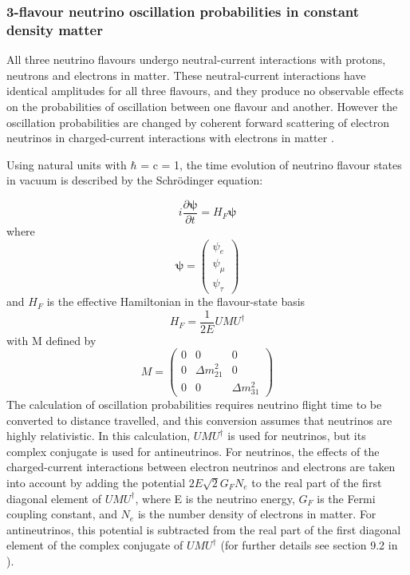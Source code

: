 %
%
\subsubsection*{3-flavour neutrino oscillation probabilities in constant density matter}

All three neutrino flavours undergo neutral-current interactions with protons, neutrons and electrons in matter. These
neutral-current interactions have identical amplitudes for all three flavours, and they produce no observable effects on
the probabilities of oscillation between one flavour and another. However the oscillation probabilities are changed by
coherent forward scattering of electron neutrinos in charged-current interactions with electrons in matter \cite{kayser2005}.

Using natural units with $\hbar$ = c = 1, the time evolution of neutrino flavour states in vacuum is described by the
Schr\"odinger equation:

\begin{equation}
i \frac{\partial \mathbf{\psi}}{\partial t} = H_{F} \mathbf{\psi}
\end{equation}
where
\begin{equation}
  \mathbf{\psi} =\left(
\begin{array}{c}
\psi_{e} \\
\psi_{\mu} \\
\psi_{\tau}
\end{array} \right)
\end{equation}
and $H_{F}$ is the effective Hamiltonian in the flavour-state basis
\begin{equation}
H_{F} = \frac{1}{2E} U M U^{\dagger}
\end{equation}
with M defined by
\begin{equation}
M = \left(
\begin{array}{ccc}
0 & 0 & 0 \\
0 & \Delta m_{21}^{2} & 0 \\
0 & 0 & \Delta m_{31}^{2}
\end{array} \right)
\end{equation}
The calculation of oscillation probabilities requires neutrino flight time to be converted to distance travelled,
and this conversion assumes that neutrinos are highly relativistic. In
this calculation, $U M U^{\dagger}$ is used for neutrinos, but its complex conjugate is used for antineutrinos. For neutrinos,
the effects of the charged-current interactions between electron neutrinos and electrons are taken into account by adding the
potential $2E \sqrt{2} G_{F} N_{e}$ to the real part of the first diagonal element of $U M U^{\dagger}$, where E is the
neutrino energy, $G_{F}$ is the Fermi coupling constant, and $N_{e}$ is the number density of electrons in matter. For
antineutrinos, this potential is subtracted from the real part of the first diagonal element of the complex conjugate of
$U M U^{\dagger}$ (for further details see section 9.2 in \cite{giunti}).

